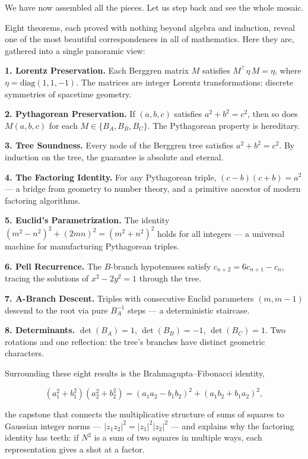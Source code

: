 We have now assembled all the pieces. Let us step back and see the whole mosaic.

Eight theorems, each proved with nothing beyond algebra and induction, reveal one of the most beautiful correspondences in all of mathematics. Here they are, gathered into a single panoramic view:

\textbf{1. Lorentz Preservation.} Each Berggren matrix $M$ satisfies $M^\top \eta\, M = \eta$, where $\eta = \mathrm{diag}(1, 1, -1)$. The matrices are integer Lorentz transformations: discrete symmetries of spacetime geometry.

\textbf{2. Pythagorean Preservation.} If $(a, b, c)$ satisfies $a^2 + b^2 = c^2$, then so does $M(a, b, c)$ for each $M \in \{B_A, B_B, B_C\}$. The Pythagorean property is hereditary.

\textbf{3. Tree Soundness.} Every node of the Berggren tree satisfies $a^2 + b^2 = c^2$. By induction on the tree, the guarantee is absolute and eternal.

\textbf{4. The Factoring Identity.} For any Pythagorean triple, $(c - b)(c + b) = a^2$ --- a bridge from geometry to number theory, and a primitive ancestor of modern factoring algorithms.

\textbf{5. Euclid's Parametrization.} The identity $(m^2 - n^2)^2 + (2mn)^2 = (m^2 + n^2)^2$ holds for all integers --- a universal machine for manufacturing Pythagorean triples.

\textbf{6. Pell Recurrence.} The $B$-branch hypotenuses satisfy $c_{n+2} = 6c_{n+1} - c_n$, tracing the solutions of $x^2 - 2y^2 = 1$ through the tree.

\textbf{7. A-Branch Descent.} Triples with consecutive Euclid parameters $(m, m-1)$ descend to the root via pure $B_A^{-1}$ steps --- a deterministic staircase.

\textbf{8. Determinants.} $\det(B_A) = 1$, $\det(B_B) = -1$, $\det(B_C) = 1$. Two rotations and one reflection: the tree's branches have distinct geometric characters.

Surrounding these eight results is the Brahmagupta--Fibonacci identity,

\[
(a_1^2 + b_1^2)(a_2^2 + b_2^2) = (a_1 a_2 - b_1 b_2)^2 + (a_1 b_2 + b_1 a_2)^2,
\]

the capstone that connects the multiplicative structure of sums of squares to Gaussian integer norms --- $|z_1 z_2|^2 = |z_1|^2 |z_2|^2$ --- and explains why the factoring identity has teeth: if $N^2$ is a sum of two squares in multiple ways, each representation gives a shot at a factor.

